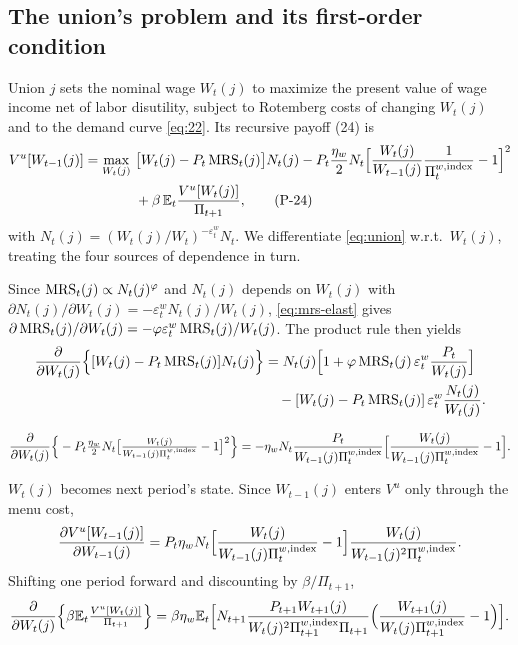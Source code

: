 \subsection{The union's problem and its first-order condition}
Union $j$ sets the nominal wage $W_t(j)$ to maximize the present value of wage income net of labor
disutility, subject to Rotemberg costs of changing $W_t(j)$ and to the demand curve \eqref{eq:22}. Its
recursive payoff (24) is
\begin{align}
V^u[W_{t-1}(j)]=\max_{W_t(j)}\ &\big[W_t(j)-P_t\operatorname{MRS}_t(j)\big]N_t(j)
-P_t\frac{\eta_w}{2}N_t\Big[\frac{W_t(j)}{W_{t-1}(j)}\frac{1}{\Pi^{w,\text{index}}_t}-1\Big]^2\nonumber\\
&+\beta\,\mathbb{E}_t\frac{V^u[W_t(j)]}{\Pi_{t+1}},\tag{P-24}\label{eq:union}
\end{align}
with $N_t(j)=(W_t(j)/W_t)^{-\varepsilon^w_t}N_t$. We differentiate \eqref{eq:union} w.r.t.\ $W_t(j)$,
treating the four sources of dependence in turn.

Since $\operatorname{MRS}_t(j)\propto N_t(j)^\varphi$ and $N_t(j)$ depends on $W_t(j)$ with
$\partial N_t(j)/\partial W_t(j)=-\varepsilon^w_t N_t(j)/W_t(j)$, \eqref{eq:mrs-elast} gives
$\partial\operatorname{MRS}_t(j)/\partial W_t(j)=-\varphi\varepsilon^w_t\operatorname{MRS}_t(j)/W_t(j)$. The product rule then yields
\begin{align*}
\frac{\partial }{\partial W_t(j)}\Big\{[W_t(j)-P_t\operatorname{MRS}_t(j)]N_t(j)\Big\}
&=N_t(j)\Big[1+\varphi\operatorname{MRS}_t(j)\,\varepsilon^w_t\frac{P_t}{W_t(j)}\Big]\\
&\quad-[W_t(j)-P_t\operatorname{MRS}_t(j)]\,\varepsilon^w_t\frac{N_t(j)}{W_t(j)} .
\end{align*}

\[
\frac{\partial }{\partial W_t(j)}\Big\{-P_t\tfrac{\eta_w}{2}N_t\big[\tfrac{W_t(j)}{W_{t-1}(j)\Pi^{w,\text{index}}_t}-1\big]^2\Big\}
=-\eta_wN_t\frac{P_t}{W_{t-1}(j)\Pi^{w,\text{index}}_t}\Big[\frac{W_t(j)}{W_{t-1}(j)\Pi^{w,\text{index}}_t}-1\Big].
\]

$W_t(j)$ becomes next period's state. Since $W_{t-1}(j)$ enters $V^u$ only through the menu cost,
\[
\frac{\partial V^u[W_{t-1}(j)]}{\partial W_{t-1}(j)}
=P_t\eta_wN_t\Big[\frac{W_t(j)}{W_{t-1}(j)\Pi^{w,\text{index}}_t}-1\Big]\frac{W_t(j)}{W_{t-1}(j)^2\Pi^{w,\text{index}}_t} .
\]
Shifting one period forward and discounting by $\beta/\Pi_{t+1}$,
\[
\frac{\partial }{\partial W_t(j)}\Big\{\beta\mathbb{E}_t\tfrac{V^u[W_t(j)]}{\Pi_{t+1}}\Big\}
=\beta\eta_w\mathbb{E}_t\Big[N_{t+1}\frac{P_{t+1}W_{t+1}(j)}{W_t(j)^2\Pi^{w,\text{index}}_{t+1}\Pi_{t+1}}
\Big(\frac{W_{t+1}(j)}{W_t(j)\Pi^{w,\text{index}}_{t+1}}-1\Big)\Big].
\]

